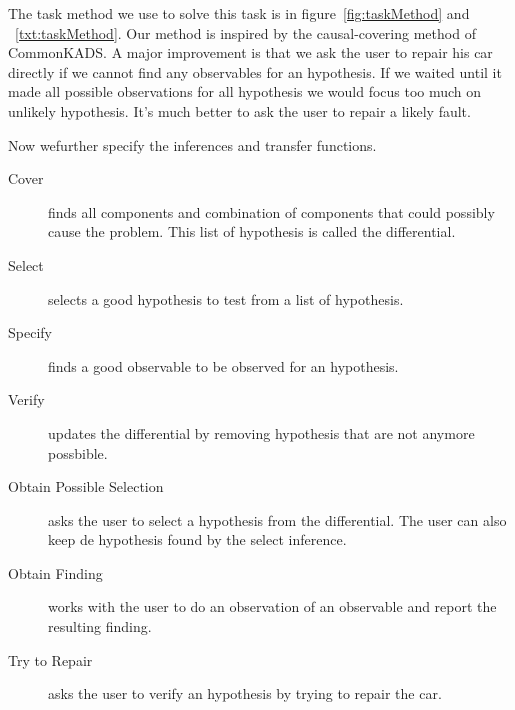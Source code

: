 The task method we use to solve this task is in figure~\ref{fig:taskMethod} and
~\ref{txt:taskMethod}. Our method is inspired by the causal-covering method of
CommonKADS. A major improvement is that we ask the user to repair his car directly if
we cannot find any observables for an hypothesis. If we waited until it made all
possible observations for all hypothesis we would focus too much on unlikely
hypothesis. It's much better to ask the user to repair a likely fault.

Now wefurther specify the inferences and transfer functions.
\begin{description}
\item[Cover] finds all components and combination of components that could
possibly cause the problem. This list of hypothesis is called the differential.
\item[Select] selects a good hypothesis to test from a list of hypothesis.
\item[Specify] finds a good observable to be observed for an hypothesis.
\item[Verify] updates the differential by removing hypothesis that are not
anymore possbible.
\item[Obtain Possible Selection] asks the user to select a hypothesis from the
differential. The user can also keep de hypothesis found by the select
inference.
\item[Obtain Finding] works with the user to do an observation of an observable
and report the resulting finding.
\item[Try to Repair] asks the user to verify an hypothesis by trying to repair
the car. 
\end{description}

